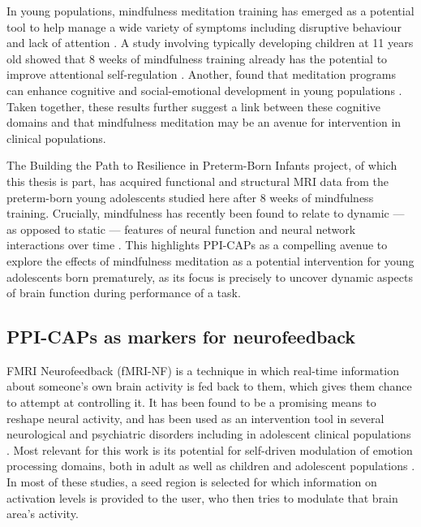 In young populations, mindfulness meditation training has emerged as a potential tool to help manage a wide variety of symptoms including disruptive behaviour \citep{Perry-Parrish2016} and lack of attention \citep{Zhang2018}. A study involving typically developing children at 11 years old showed that 8 weeks of mindfulness training already has the potential to improve attentional self-regulation \citep{Felver2017}. Another, found that meditation programs can enhance cognitive and social-emotional development in young populations \citep{Schonert-Reichl2015}. Taken together, these results further suggest a link between these cognitive domains and that mindfulness meditation may be an avenue for intervention in clinical populations.


The Building the Path to Resilience in Preterm-Born Infants project, of which this thesis is part, has acquired functional and structural MRI data from the preterm-born young adolescents studied here after 8 weeks of mindfulness training. Crucially, mindfulness has recently been found to relate to dynamic --- as opposed to static --- features of neural function and neural network interactions over time \citep{Marusak2018}. This highlights PPI-CAPs as a compelling avenue to explore the effects of mindfulness meditation as a potential intervention for young adolescents born prematurely, as its focus is precisely to uncover dynamic aspects of brain function during performance of a task.  





\subsection*{PPI-CAPs as markers for neurofeedback} 
FMRI Neurofeedback (fMRI-NF) is a technique in which real-time information about someone's own brain activity is fed back to them, which gives them chance to attempt at controlling it. It has been found to be a promising means to reshape neural activity, and has been used as an intervention tool in several neurological and psychiatric disorders \citep{Guntensperger2017, Misaki2019} including in adolescent clinical populations \citep{Alegria2017}. Most relevant for this work is its potential for self-driven modulation of emotion processing domains, both in adult \citep{Koush2017,Lorenzetti2018} as well as children and adolescent populations \citep{CohenKadosh2016}. In most of these studies, a seed region is selected for which information on activation levels is provided to the user, who then tries to modulate that brain area's activity. 

